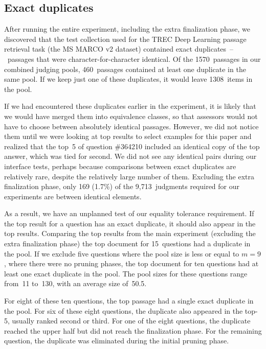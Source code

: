 \subsection{Exact duplicates}

After running the entire experiment, including the extra finalization phase, we discovered that the test collection used for the TREC Deep Learning passage retrieval task (the MS MARCO v2 dataset) contained exact duplicates~--~passages that were character-for-character identical. Of the 1570~passages in our combined judging pools, 460~passages contained at least one duplicate in the same pool. If we keep just one of these duplicates, it would leave 1308~items in the pool.

If we had encountered these duplicates earlier in the experiment, it is likely that we would have merged them into equivalence classes, so that assessors would not have to choose between absolutely identical passages. However, we did not notice them until we were looking at top results to select examples for this paper and realized that the top~5 of question \#364210 included an identical copy of the top answer, which was tied for second. We did not see any identical pairs during our interface tests, perhaps because comparisons between exact duplicates are relatively rare, despite the relatively large number of them. Excluding the extra finalization phase, only 169 (1.7\%) of the 9,713~judgments required for our experiments are between identical elements. 

As a result, we have an unplanned test of our equality tolerance requirement. If the top result for a question has an exact duplicate, it should also appear in the top results. Comparing the top results from the main experiment (excluding the extra finalization phase) the top document for 15~questions had a duplicate in the pool. If we exclude five questions where the pool size is less or equal to $m = 9$, where there were no pruning phases, the top document for ten questions had at least one exact duplicate in the pool. The pool sizes for these questions range from~11 to~130, with an average size of~50.5.

For eight of these ten questions, the top passage had a single exact duplicate in the pool. For six of these eight questions, the duplicate also appeared in the top-5, usually ranked second or third. For one of the eight questions, the duplicate reached the upper half but did not reach the finalization phase. For the remaining question, the duplicate was eliminated during the initial pruning phase.

